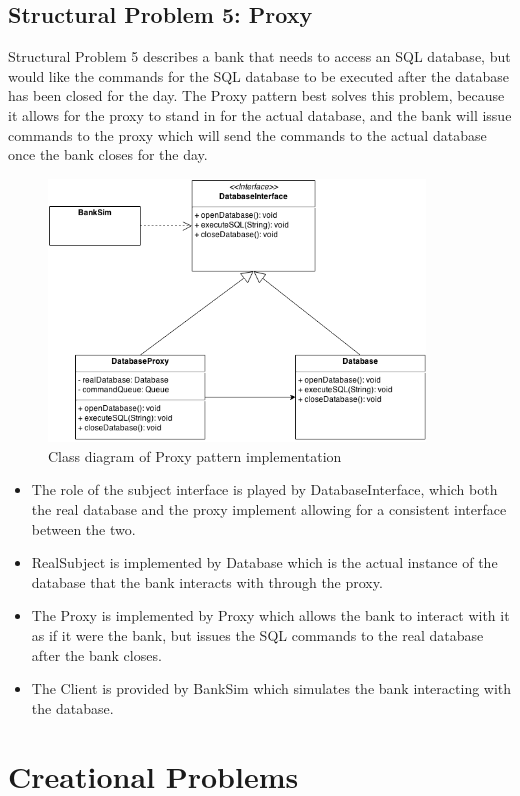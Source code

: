 \documentclass[12pt]{article}
\begin{document}
\subsection{Structural Problem 5: Proxy}

Structural Problem 5 describes a bank that needs to access an SQL database, but
would like the commands for the SQL database to be executed after the database
has been closed for the day. The Proxy pattern best solves this problem, because
it allows for the proxy to stand in for the actual database, and the bank will 
issue commands to the proxy which will send the commands to the actual database
once the bank closes for the day.

\begin{figure}[!htb]
  \begin{center}
    \includegraphics[width=100mm, page=1]{Proxy.png}
    \caption{Class diagram of Proxy pattern implementation}
    \label{fig:proxy}
  \end{center} 
\end{figure}

\begin{itemize}
\item The role of the subject interface is played by 
  {\ttfamily DatabaseInterface}, which both the real database and the proxy 
  implement allowing for a consistent interface between the two. 
\item RealSubject is implemented by {\ttfamily Database} which is the actual 
  instance of the database that the bank interacts with through the proxy.
\item The Proxy is implemented by {\ttfamily Proxy} which allows the bank to
  interact with it as if it were the bank, but issues the SQL commands to the
  real database after the bank closes.
\item The Client is provided by {\ttfamily BankSim} which simulates the bank
  interacting with the database.
\end{itemize}

\section{Creational Problems}
\end{document}
